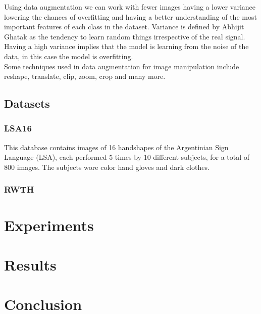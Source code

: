 \documentclass[runningheads,a4paper]{llncs}
\begin{document}
Using data augmentation we can work with fewer images having a lower variance lowering the chances of overfitting and having a better understanding of the most important features of each class in the dataset. Variance is defined by Abhijit Ghatak \cite{data_augmentation} as the tendency to learn random things irrespective of the real signal. Having a high variance implies that the model is learning from the noise of the data, in this case the model is overfitting. \\

Some techniques used in data augmentation for image manipulation include reshape, translate, clip, zoom, crop and many more.

\subsection{Datasets}

\subsubsection{LSA16}

This database contains images of 16 handshapes of the Argentinian Sign Language (LSA), each performed 5 times by 10 different subjects, for a total of 800 images. The subjects wore color hand gloves and dark clothes.

\subsubsection{RWTH}

\section{Experiments}

\section{Results}

\section{Conclusion}
\end{document}
